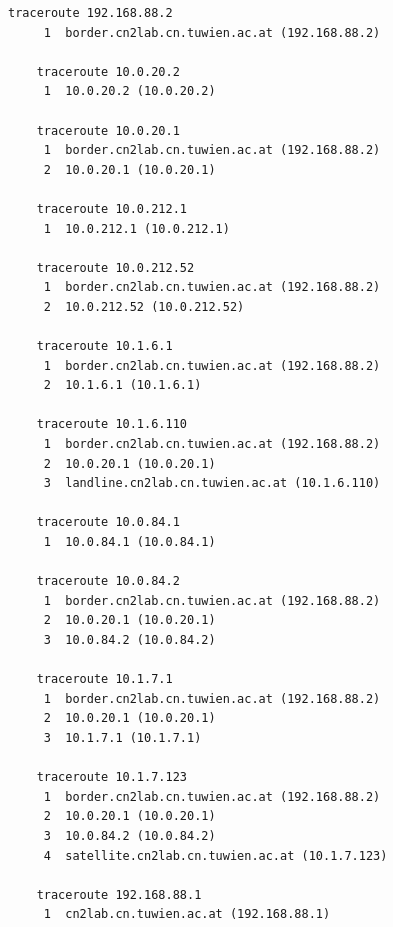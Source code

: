 \documentclass[parskip=full]{scrartcl}
\begin{document}
\begin{lstlisting}[language=tex, breaklines, frame=single, caption={Routes discovered by \texttt{traceroute <IP>}}, label=lst:routes_traceroute]
    traceroute 192.168.88.2
     1  border.cn2lab.cn.tuwien.ac.at (192.168.88.2)
    
    traceroute 10.0.20.2
     1  10.0.20.2 (10.0.20.2)
    
    traceroute 10.0.20.1
     1  border.cn2lab.cn.tuwien.ac.at (192.168.88.2)
     2  10.0.20.1 (10.0.20.1)
    
    traceroute 10.0.212.1
     1  10.0.212.1 (10.0.212.1)
    
    traceroute 10.0.212.52
     1  border.cn2lab.cn.tuwien.ac.at (192.168.88.2)
     2  10.0.212.52 (10.0.212.52)
    
    traceroute 10.1.6.1
     1  border.cn2lab.cn.tuwien.ac.at (192.168.88.2)
     2  10.1.6.1 (10.1.6.1)
    
    traceroute 10.1.6.110
     1  border.cn2lab.cn.tuwien.ac.at (192.168.88.2)
     2  10.0.20.1 (10.0.20.1)
     3  landline.cn2lab.cn.tuwien.ac.at (10.1.6.110)
    
    traceroute 10.0.84.1
     1  10.0.84.1 (10.0.84.1)
    
    traceroute 10.0.84.2
     1  border.cn2lab.cn.tuwien.ac.at (192.168.88.2)
     2  10.0.20.1 (10.0.20.1)
     3  10.0.84.2 (10.0.84.2)
    
    traceroute 10.1.7.1
     1  border.cn2lab.cn.tuwien.ac.at (192.168.88.2)
     2  10.0.20.1 (10.0.20.1)
     3  10.1.7.1 (10.1.7.1)
    
    traceroute 10.1.7.123
     1  border.cn2lab.cn.tuwien.ac.at (192.168.88.2)
     2  10.0.20.1 (10.0.20.1)
     3  10.0.84.2 (10.0.84.2)
     4  satellite.cn2lab.cn.tuwien.ac.at (10.1.7.123)
    
    traceroute 192.168.88.1
     1  cn2lab.cn.tuwien.ac.at (192.168.88.1)
    \end{lstlisting}
    
\end{document}
